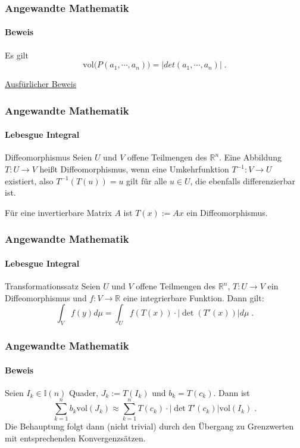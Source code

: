 \documentclass{beamer}
\begin{document}
\begin{frame}
    \frametitle{Angewandte Mathematik}
\framesubtitle{Beweis}

Es gilt  $$  \text{vol} \bigr( P(a_1, \cdots, a_n) \bigr) =  | det (a_1, \cdots, a_n) |   \; .$$

\href{https://www.math.uchicago.edu/~may/VIGRE/VIGRE2007/REUPapers/FINALAPP/Peng.pdf}{Ausfürlicher Beweis}
 \end{frame}



\begin{frame}
    \frametitle{Angewandte Mathematik}
\framesubtitle{Lebesgue Integral}
\begin{block}{Diffeomorphismus}
Seien $U$ und $V$ offene Teilmengen des $\mathbb{R}^n$. Eine Abbildung  $T: U \to V$ heißt Diffeomorphismus, wenn eine  Umkehrfunktion $T^{-1}: V  \to U$ existiert, also $T^{-1} (T (u)) = u$ gilt für alle $u \in U$, die ebenfalls differenzierbar ist.
\end{block}

\begin{block}{}
Für eine invertierbare Matrix $A$ ist $T(x):= Ax$ ein Diffeomorphismus.
\end{block}
 \end{frame}


\begin{frame}
    \frametitle{Angewandte Mathematik}
\framesubtitle{Lebesgue Integral}
\begin{block}{Transformationssatz}
Seien $U$ und $V$ offene Teilmengen des $\mathbb{R}^n$, $T: U \to V$ ein Diffeomorphismus und $f: V \to \mathbb{R}$ eine integrierbare Funktion. Dann gilt:
$$ \int_V  f(y)  d \mu = \int_U f(T (x))  \cdot | \det(T' (x)) | d \mu   \; .$$
\end{block}
 \end{frame}

\begin{frame}
    \frametitle{Angewandte Mathematik}
\framesubtitle{Beweis}
Seien $I_k \in \mathbb{I}(n)$ Quader, $J_k := T(I_k)$ und $b_k = T(c_k)$. Dann ist 
$$\sum_{k=1}^n  b_k  \text{vol}(J_k) \approx  \sum_{k=1}^n T(c_k) \cdot | \det T' (c_k)|  \text{vol}(I_k) \; .$$
Die Behauptung folgt dann (nicht trivial) durch den Übergang zu Grenzwerten mit entsprechenden Konvergenzsätzen.
 \end{frame}
\end{document}
